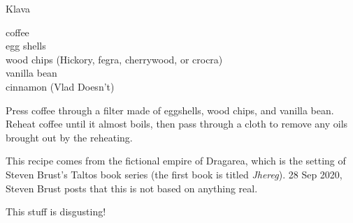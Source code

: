 
\begin{recipe}{Klava}
  \maketitle

  \begin{ingredients}
    coffee\\
    egg shells\\
    wood chips (Hickory, fegra, cherrywood, or crocra)\\
    vanilla bean\\
    cinnamon (Vlad Doesn't)
  \end{ingredients}

  Press coffee through a filter made of eggshells, wood chips, and vanilla
  bean. Reheat coffee until it almost boils, then pass through a cloth to
  remove any oils brought out by the reheating.

  \begin{history}
    This recipe comes from the fictional empire of Dragarea, which is the
    setting of Steven Brust's Taltos book series (the first book is titled
    \emph{Jhereg}). 28 Sep 2020, Steven Brust posts that this is not based
    on anything real.
  \end{history}

  \begin{note}
    This stuff is disgusting!
  \end{note}
\end{recipe}


